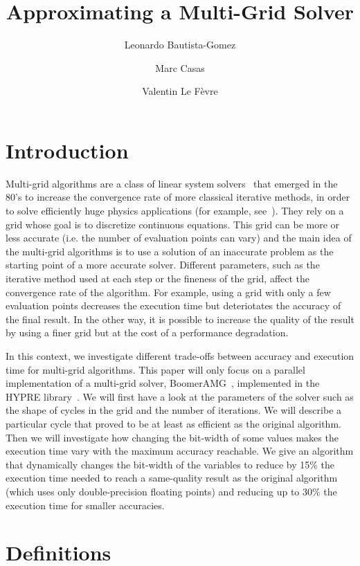 \documentclass[sigplan]{acmart}
\title{Approximating a Multi-Grid Solver}
\author{Leonardo Bautista-Gomez}
\affiliation{%
  \institution{Barcelona Supercomputing Center}
  \country{Spain}
}
\author{Marc Casas}
\affiliation{%
  \institution{Barcelona Supercomputing Center}
  \country{Spain}
}
\author{Valentin Le Fèvre}
\affiliation{%
\institution{ENS de Lyon}
\country{France}}
\affiliation{%
  \institution{Barcelona Supercomputing Center}
  \country{Spain}
}
\begin{document}
\maketitle

\section{Introduction}

Multi-grid algorithms are a class of linear system solvers~\cite{Hackbusch1991} that emerged in the 80's to increase the convergence rate of more classical iterative methods, in order to solve
efficiently huge physics applications (for example, see~\cite{Ashby1996}). They rely on a grid whose goal is to discretize continuous equations. This grid can be more or less accurate (i.e.
the number of evaluation points can vary) and the main idea of the multi-grid algorithms is to use a solution of an inaccurate problem as the starting point of a more accurate solver.
Different parameters, such as the iterative method used at each step or the fineness of the grid, affect the convergence rate of the algorithm. For example, using a grid with only a few
evaluation points decreases the execution time but deteriotates the accuracy of the final result. In the other way, it is possible to increase the quality of the result by using a finer
grid but at the cost of a performance degradation.

In this context, we investigate different trade-offs between accuracy and execution time for multi-grid algorithms. This paper will only focus on a parallel implementation of a multi-grid solver,
BoomerAMG~\cite{boomerAMG}, implemented in the HYPRE library~\cite{Falgout2002}. We will first have a look at the parameters of the solver such as the shape of cycles in the grid and the
number of iterations. We will describe a particular cycle that proved to be at least as efficient as the original algorithm. Then we will investigate how changing the bit-width of
some values makes the execution time vary with the maximum accuracy reachable. We give an algorithm that dynamically changes the bit-width of the variables to reduce by 15\% the execution
time needed to reach a same-quality result as the original algorithm (which uses only double-precision floating points) and reducing up to 30\% the execution time for smaller accuracies.

\section{Definitions}
\end{document}
